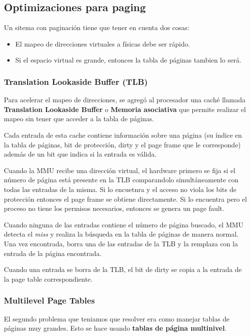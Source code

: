 \subsection{Optimizaciones para paging}
Un sitema con paginación tiene que tener en cuenta dos cosas:
\begin{itemize}
	\item El mapeo de direcciones virtuales a físicas debe ser rápido.
	\item Si el espacio virtual es grande, entonces la tabla de páginas tambien lo será.
\end{itemize}
\subsubsection{Translation Lookaside Buffer (TLB)}
Para acelerar el mapeo de direcciones, se agregó al procesador una caché llamada \textbf{Translation Lookaside Buffer} o \textbf{Memoria asociativa} que permite realizar el mapeo sin tener que acceder a la tabla de páginas.

Cada entrada de esta cache contiene información sobre una página (su índice en la tabla de páginas, bit de protección, dirty y el page frame que le corresponde) además de un bit que indica si la entrada es válida.

Cuando la MMU recibe una dirección virtual, el hardware primero se fija si el número de página está presente en la TLB comparandolo simultáneamente con todas las entradas de la misma. Si lo encuetnra y el acceso no viola los bits de protección entonces el page frame se obtiene directamente. Si lo encuentra pero el proceso no tiene los permisos necesarios, entonces se genera un page fault.

Cuando ninguna de las entradas contiene el número de página buscado, el MMU detecta el \textit{miss} y realiza la búsqueda en la tabla de páginas de manera normal. Una vez encontrada, borra una de las entradas de la TLB y la remplaza con la entrada de la página encontrada.

Cuando una entrada se borra de la TLB, el bit de dirty se copia a la entrada de la page table correspondiente.

\subsubsection{Multilevel Page Tables}
El segundo problema que teniamos que resolver era como manejar tablas de páginas muy grandes. Esto se hace usando \textbf{tablas de página multinivel}. 

